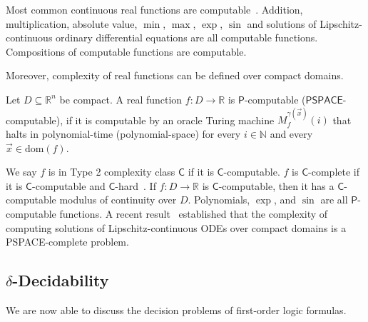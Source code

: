 \documentclass[envcountsect]{llncs}
\newcommand{\dom}{\mathrm{dom}}
\begin{document}
Most common continuous real functions are computable~\cite{CAbook}. Addition, multiplication, absolute value, $\min$, $\max$, $\exp$, $\sin$ and solutions of Lipschitz-continuous ordinary differential equations are all computable functions. Compositions of computable functions are computable.


Moreover, complexity of real functions can be defined over compact domains. 

\begin{definition}[\cite{Ko92}] Let $D\subseteq \mathbb{R}^n$ be compact. A real function $f:D\rightarrow\mathbb{R}$ is $\mathsf{P}$-computable ($\mathsf{PSPACE}$-computable), if it is computable by an oracle Turing machine $M_{f}^{\gamma(\vec x)}(i)$ that halts in polynomial-time (polynomial-space) for every $i\in \mathbb{N}$ and every $\vec x\in \dom(f)$. 
\end{definition}



We say $f$ is in Type 2 complexity class $\mathsf{C}$ if it is $\mathsf{C}$-computable. $f$ is $\mathsf{C}$-complete if it is $\mathsf{C}$-computable and $\mathsf{C}$-hard~\cite{Kobook}. If $f:D\rightarrow \mathbb{R}$ is $\mathsf{C}$-computable, then it has a $\mathsf{C}$-computable modulus of continuity over $D$. Polynomials, $\exp$, and $\sin$ are all $\mathsf{P}$-computable functions. A recent result~\cite{Kawamura09} established that the complexity of computing solutions of Lipschitz-continuous ODEs over compact domains is a {\sf PSPACE}-complete problem. 

\subsection{$\delta$-Decidability}

We are now able to discuss the decision problems of first-order logic formulas.

\begin{definition}
\end{definition}

\begin{definition}
\end{definition}


\begin{definition}
\end{definition}

\begin{definition}
\end{definition}
\end{document}
